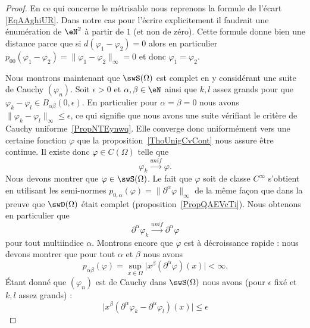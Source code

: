 \begin{proof}
    En ce qui concerne le métrisable nous reprenons la formule de l'écart \eqref{EqAAghiUR}. Dans notre cas pour l'écrire explicitement il faudrait une énumération de \( \eN^2\) à partir de \( 1\) (et non de zéro). Cette formule donne bien une distance parce que si \( d(\varphi_1-\varphi_2)=0\) alors en particulier \( p_{00}(\varphi_1-\varphi_2)=\| \varphi_1-\varphi_2 \|_{\infty}=0\) et donc \( \varphi_1=\varphi_2\).

    Nous montrons maintenant que \( \swS(\Omega)\) est complet en y considérant une suite de Cauchy \( (\varphi_n)\). Soit \( \epsilon>0\) et \( \alpha,\beta\in \eN\) ainsi que \( k,l\) assez grands pour que \( \varphi_k-\varphi_l\in B_{\alpha\beta}(0,\epsilon)\). En particulier pour \( \alpha=\beta=0\) nous avons \( \| \varphi_k-\varphi_l \|_{\infty}\leq \epsilon\), ce qui signifie que nous avons une suite vérifiant le critère de Cauchy uniforme~\ref{PropNTEynwq}. Elle converge donc uniformément vers une certaine fonction \( \varphi\) que la proposition~\ref{ThoUnigCvCont} nous assure être continue. Il existe donc \( \varphi\in C(\Omega)\) telle que
    \begin{equation}
        \varphi_k\stackrel{unif}{\longrightarrow}\varphi.
    \end{equation}
    Nous devons montrer que \( \varphi\in\swS(\Omega)\). Le fait que \( \varphi\) soit de classe \(  C^{\infty}\) s'obtient en utilisant les semi-normes \( p_{0,\alpha}(\varphi)=\| \partial^{\alpha}\varphi \|_{\infty}\) de la même façon que dans la preuve que \( \swD(\Omega)\) était complet (proposition~\ref{PropQAEVcTi}). Nous obtenons en particulier que
    \begin{equation}    \label{EqSZyYkqk}
        \partial^{\alpha}\varphi_k\stackrel{unif}{\longrightarrow}\partial^{\alpha}\varphi
    \end{equation}
    pour tout multiindice \( \alpha\). Montrons encore que \( \varphi\) est à décroissance rapide : nous devons montrer que pour tout \( \alpha\) et \( \beta\) nous avons
    \begin{equation}
        p_{\alpha\beta}(\varphi)=\sup_{x\in \Omega}\big| x^{\beta}(\partial^{\alpha}\varphi)(x) \big|<\infty.
    \end{equation}
    Étant donné que \( (\varphi_n)\) est de Cauchy dans \( \swS(\Omega)\) nous avons (pour \( \epsilon\) fixé et \( k,l\) assez grands) :
    \begin{equation}
        \big| x^{\beta}(\partial^{\alpha}\varphi_k-\partial^{\alpha}\varphi_l)(x) \big|\leq \epsilon

\end{equation}
\end{proof}
